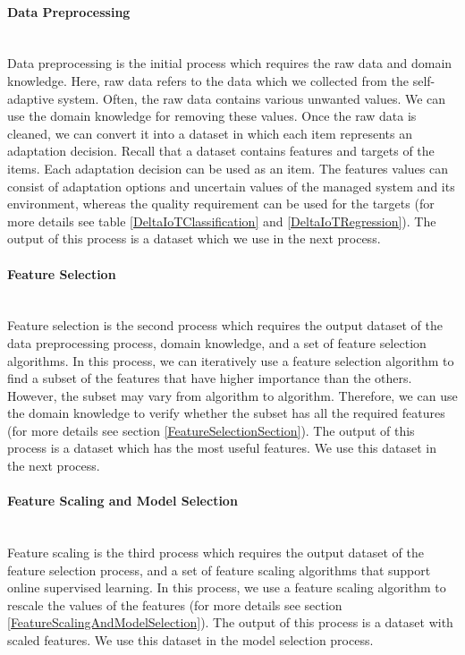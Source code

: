 \documentclass[a4paper,12pt]{article}
\newcommand{
    \subsubsubsection}[1]{\paragraph{#1}\mbox{}\\
}
\begin{document}
\subsubsubsection{Data Preprocessing}
Data preprocessing is the initial process which requires the raw data and domain knowledge. Here, raw data refers to the data which we collected from the self-adaptive system. Often, the raw data contains various unwanted values. We can use the domain knowledge for removing these values. Once the raw data is cleaned, we can convert it into a dataset in which each item represents an adaptation decision. Recall that a dataset contains features and targets of the items. Each adaptation decision can be used as an item. The features values can consist of adaptation options and uncertain values of the managed system and its environment, whereas the quality requirement can be used for the targets (for more details see table \ref{DeltaIoTClassification} and \ref{DeltaIoTRegression}). The output of this process is a dataset which we use in the next process.
\subsubsubsection{Feature Selection}
Feature selection is the second process which requires the output dataset of the data preprocessing process, domain knowledge, and a set of feature selection algorithms. In this process, we can iteratively use a feature selection algorithm to find a subset of the features that have higher importance than the others. However, the subset may vary from algorithm to algorithm. Therefore, we can use the domain knowledge to verify whether the subset has all the required features (for more details see section \ref{FeatureSelectionSection}). The output of this process is a dataset which has the most useful features. We use this dataset in the next process.
\subsubsubsection{Feature Scaling and Model Selection}
Feature scaling is the third process which requires the output dataset of the feature selection process, and a set of feature scaling algorithms that support online supervised learning. In this process, we use a feature scaling algorithm to rescale the values of the features (for more details see section \ref{FeatureScalingAndModelSelection}). The output of this process is a dataset with scaled features. We use this dataset in the model selection process.
\end{document}
